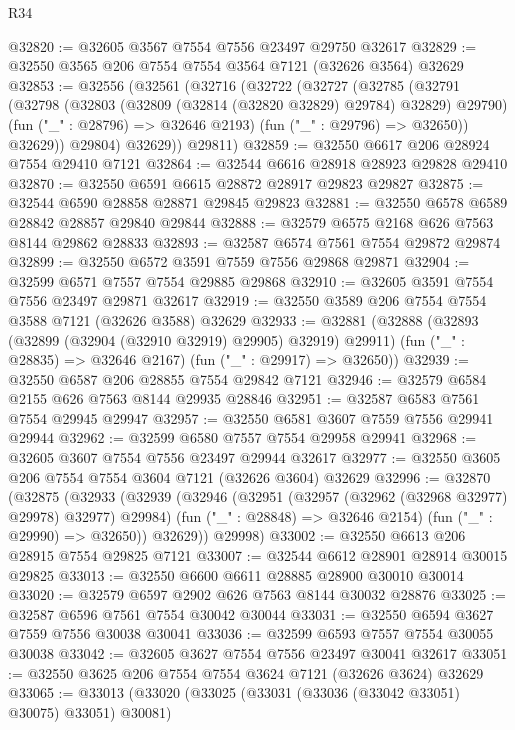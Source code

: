 \begin{lexlean}{R34}
\begin{coremodule}
@32820 := @32605 @3567 @7554 @7556 @23497 @29750 @32617
@32829 := @32550 @3565 @206 @7554 @7554 @3564 @7121 (@32626 @3564) @32629
@32853 := @32556
    (@32561
      (@32716
        (@32722
          (@32727
            (@32785
              (@32791
                (@32798
                  (@32803 (@32809 (@32814 (@32820 @32829) @29784) @32829) @29790)
                  (fun ("_" : @28796) => @32646 @2193)
                  (fun ("_" : @29796) => @32650))
                @32629))
            @29804)
          @32629))
      @29811)
@32859 := @32550 @6617 @206 @28924 @7554 @29410 @7121
@32864 := @32544 @6616 @28918 @28923 @29828 @29410
@32870 := @32550 @6591 @6615 @28872 @28917 @29823 @29827
@32875 := @32544 @6590 @28858 @28871 @29845 @29823
@32881 := @32550 @6578 @6589 @28842 @28857 @29840 @29844
@32888 := @32579 @6575 @2168 @626 @7563 @8144 @29862 @28833
@32893 := @32587 @6574 @7561 @7554 @29872 @29874
@32899 := @32550 @6572 @3591 @7559 @7556 @29868 @29871
@32904 := @32599 @6571 @7557 @7554 @29885 @29868
@32910 := @32605 @3591 @7554 @7556 @23497 @29871 @32617
@32919 := @32550 @3589 @206 @7554 @7554 @3588 @7121 (@32626 @3588) @32629
@32933 := @32881
    (@32888
      (@32893 (@32899 (@32904 (@32910 @32919) @29905) @32919) @29911)
      (fun ("_" : @28835) => @32646 @2167)
      (fun ("_" : @29917) => @32650))
@32939 := @32550 @6587 @206 @28855 @7554 @29842 @7121
@32946 := @32579 @6584 @2155 @626 @7563 @8144 @29935 @28846
@32951 := @32587 @6583 @7561 @7554 @29945 @29947
@32957 := @32550 @6581 @3607 @7559 @7556 @29941 @29944
@32962 := @32599 @6580 @7557 @7554 @29958 @29941
@32968 := @32605 @3607 @7554 @7556 @23497 @29944 @32617
@32977 := @32550 @3605 @206 @7554 @7554 @3604 @7121 (@32626 @3604) @32629
@32996 := @32870
    (@32875
      (@32933
        (@32939
          (@32946
            (@32951 (@32957 (@32962 (@32968 @32977) @29978) @32977) @29984)
            (fun ("_" : @28848) => @32646 @2154)
            (fun ("_" : @29990) => @32650))
          @32629))
      @29998)
@33002 := @32550 @6613 @206 @28915 @7554 @29825 @7121
@33007 := @32544 @6612 @28901 @28914 @30015 @29825
@33013 := @32550 @6600 @6611 @28885 @28900 @30010 @30014
@33020 := @32579 @6597 @2902 @626 @7563 @8144 @30032 @28876
@33025 := @32587 @6596 @7561 @7554 @30042 @30044
@33031 := @32550 @6594 @3627 @7559 @7556 @30038 @30041
@33036 := @32599 @6593 @7557 @7554 @30055 @30038
@33042 := @32605 @3627 @7554 @7556 @23497 @30041 @32617
@33051 := @32550 @3625 @206 @7554 @7554 @3624 @7121 (@32626 @3624) @32629
@33065 := @33013
    (@33020
      (@33025 (@33031 (@33036 (@33042 @33051) @30075) @33051) @30081)

\end{coremodule}
\end{lexlean}
